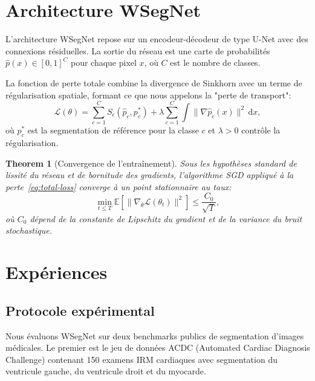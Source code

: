 \documentclass[11pt,a4paper]{article}
\newtheorem{theorem}{Theorem}[section]
\theoremstyle{definition}
\begin{document}
\section{Architecture WSegNet}

L'architecture WSegNet repose sur un encodeur-d\'ecodeur de type U-Net
avec des connexions r\'esiduelles. La sortie du r\'eseau est une carte
de probabilit\'es $\hat{p}(x) \in [0, 1]^C$ pour chaque pixel $x$,
o\`u $C$ est le nombre de classes.

La fonction de perte totale combine la divergence de Sinkhorn avec un
terme de r\'egularisation spatiale, formant ce que nous appelons la
"perte de transport":
\begin{equation}\label{eq:total-loss}
  \mathcal{L}(\theta) = \sum_{c=1}^C S_\epsilon(\hat{p}_c, p_c^*)
    + \lambda \sum_{c=1}^C \int \|\nabla \hat{p}_c(x)\|^2 \, \mathrm{d}x,
\end{equation}
o\`u $p_c^*$ est la segmentation de r\'ef\'erence pour la classe $c$
et $\lambda > 0$ contr\^ole la r\'egularisation.

\begin{theorem}[Convergence de l'entra\^inement]\label{thm:convergence}
Sous les hypoth\`eses standard de lissit\'e du r\'eseau et de bornitude
des gradients, l'algorithme SGD appliqu\'e \`a la perte~\eqref{eq:total-loss}
converge \`a un point stationnaire au taux:
\begin{equation}
  \min_{t \leq T} \mathbb{E}[\|\nabla_\theta \mathcal{L}(\theta_t)\|^2]
    \leq \frac{C_0}{\sqrt{T}},
\end{equation}
o\`u $C_0$ d\'epend de la constante de Lipschitz du gradient et de la
variance du bruit stochastique.
\end{theorem}


\section{Exp\'eriences}

\subsection{Protocole exp\'erimental}

Nous \'evaluons WSegNet sur deux benchmarks publics de segmentation
d'images m\'edicales.  Le premier est le jeu de donn\'ees ACDC
(Automated Cardiac Diagnosis Challenge) contenant 150 examens IRM
cardiaques avec segmentation du ventricule gauche, du ventricule droit
et du myocarde.
\end{document}

